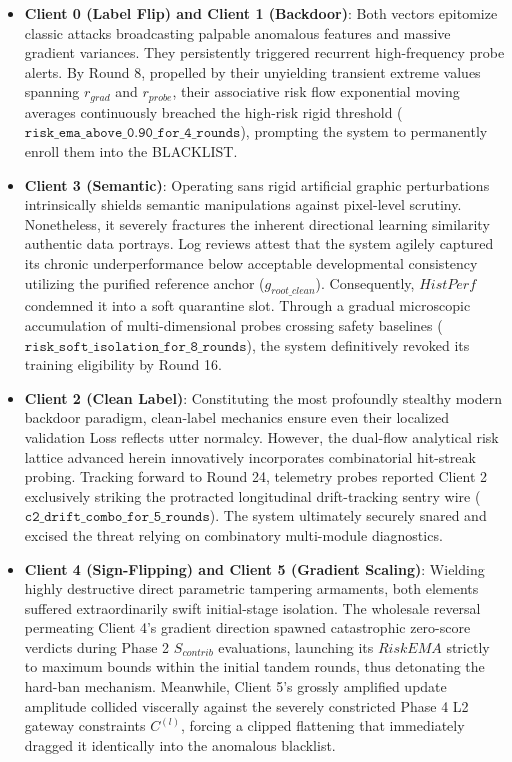 \documentclass[runningheads]{llncs}
\begin{document}
\begin{itemize}
    \item \textbf{Client 0 (Label Flip) and Client 1 (Backdoor)}: Both vectors epitomize classic attacks broadcasting palpable anomalous features and massive gradient variances. They persistently triggered recurrent high-frequency probe alerts. By Round 8, propelled by their unyielding transient extreme values spanning $r_{grad}$ and $r_{probe}$, their associative risk flow exponential moving averages continuously breached the high-risk rigid threshold ($\texttt{risk\_ema\_above\_0.90\_for\_4\_rounds}$), prompting the system to permanently enroll them into the BLACKLIST.
    \item \textbf{Client 3 (Semantic)}: Operating sans rigid artificial graphic perturbations intrinsically shields semantic manipulations against pixel-level scrutiny. Nonetheless, it severely fractures the inherent directional learning similarity authentic data portrays. Log reviews attest that the system agilely captured its chronic underperformance below acceptable developmental consistency utilizing the purified reference anchor ($g_{root\_clean}$). Consequently, $HistPerf$ condemned it into a soft quarantine slot. Through a gradual microscopic accumulation of multi-dimensional probes crossing safety baselines ($\texttt{risk\_soft\_isolation\_for\_8\_rounds}$), the system definitively revoked its training eligibility by Round 16.
    \item \textbf{Client 2 (Clean Label)}: Constituting the most profoundly stealthy modern backdoor paradigm, clean-label mechanics ensure even their localized validation Loss reflects utter normalcy. However, the dual-flow analytical risk lattice advanced herein innovatively incorporates combinatorial hit-streak probing. Tracking forward to Round 24, telemetry probes reported Client 2 exclusively striking the protracted longitudinal drift-tracking sentry wire ($\texttt{c2\_drift\_combo\_for\_5\_rounds}$). The system ultimately securely snared and excised the threat relying on combinatory multi-module diagnostics.
    \item \textbf{Client 4 (Sign-Flipping) and Client 5 (Gradient Scaling)}: Wielding highly destructive direct parametric tampering armaments, both elements suffered extraordinarily swift initial-stage isolation. The wholesale reversal permeating Client 4's gradient direction spawned catastrophic zero-score verdicts during Phase 2 $S_{contrib}$ evaluations, launching its $RiskEMA$ strictly to maximum bounds within the initial tandem rounds, thus detonating the hard-ban mechanism. Meanwhile, Client 5's grossly amplified update amplitude collided viscerally against the severely constricted Phase 4 L2 gateway constraints $C^{(l)}$, forcing a clipped flattening that immediately dragged it identically into the anomalous blacklist.
\end{itemize}
\end{document}
